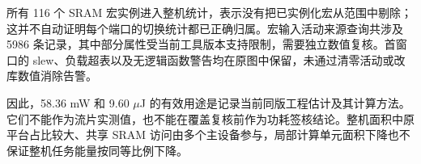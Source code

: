 所有 116 个 SRAM 宏实例进入整机统计，表示没有把已实例化宏从范围中剔除；这并不自动证明每个端口的切换统计都已正确归属。宏输入活动来源查询共涉及 5986 条记录，其中部分属性受当前工具版本支持限制，需要独立数值复核。首窗口的 slew、负载超表以及无逻辑函数警告均在原图中保留，未通过清零活动或改库数值消除告警。

因此，58.36 mW 和 9.60 $\mu$J 的有效用途是记录当前同版工程估计及其计算方法。它们不能作为流片实测值，也不能在覆盖复核前作为功耗签核结论。整机面积中原平台占比较大、共享 SRAM 访问由多个主设备参与，局部计算单元面积下降也不保证整机任务能量按同等比例下降。
